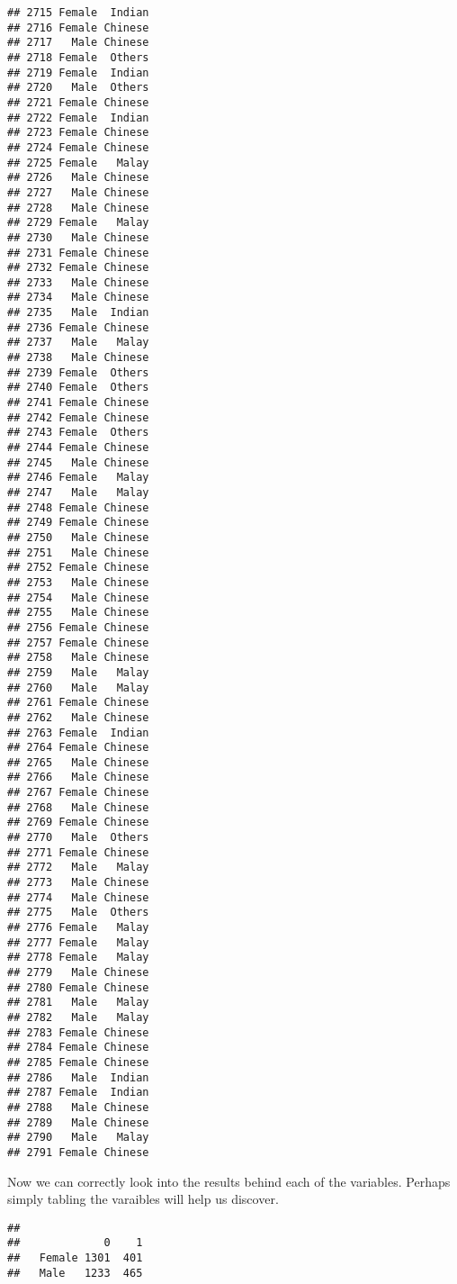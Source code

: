 \documentclass[
]{article}
\newenvironment{Shaded}{\begin{snugshade}}{\end{snugshade}}
\newcommand{\FunctionTok}[1]{\textcolor[rgb]{0.13,0.29,0.53}{\textbf{#1}}}
\newcommand{\NormalTok}[1]{#1}
\newcommand{\SpecialCharTok}[1]{\textcolor[rgb]{0.81,0.36,0.00}{\textbf{#1}}}
\begin{document}
\begin{verbatim}
## 2715 Female  Indian
## 2716 Female Chinese
## 2717   Male Chinese
## 2718 Female  Others
## 2719 Female  Indian
## 2720   Male  Others
## 2721 Female Chinese
## 2722 Female  Indian
## 2723 Female Chinese
## 2724 Female Chinese
## 2725 Female   Malay
## 2726   Male Chinese
## 2727   Male Chinese
## 2728   Male Chinese
## 2729 Female   Malay
## 2730   Male Chinese
## 2731 Female Chinese
## 2732 Female Chinese
## 2733   Male Chinese
## 2734   Male Chinese
## 2735   Male  Indian
## 2736 Female Chinese
## 2737   Male   Malay
## 2738   Male Chinese
## 2739 Female  Others
## 2740 Female  Others
## 2741 Female Chinese
## 2742 Female Chinese
## 2743 Female  Others
## 2744 Female Chinese
## 2745   Male Chinese
## 2746 Female   Malay
## 2747   Male   Malay
## 2748 Female Chinese
## 2749 Female Chinese
## 2750   Male Chinese
## 2751   Male Chinese
## 2752 Female Chinese
## 2753   Male Chinese
## 2754   Male Chinese
## 2755   Male Chinese
## 2756 Female Chinese
## 2757 Female Chinese
## 2758   Male Chinese
## 2759   Male   Malay
## 2760   Male   Malay
## 2761 Female Chinese
## 2762   Male Chinese
## 2763 Female  Indian
## 2764 Female Chinese
## 2765   Male Chinese
## 2766   Male Chinese
## 2767 Female Chinese
## 2768   Male Chinese
## 2769 Female Chinese
## 2770   Male  Others
## 2771 Female Chinese
## 2772   Male   Malay
## 2773   Male Chinese
## 2774   Male Chinese
## 2775   Male  Others
## 2776 Female   Malay
## 2777 Female   Malay
## 2778 Female   Malay
## 2779   Male Chinese
## 2780 Female Chinese
## 2781   Male   Malay
## 2782   Male   Malay
## 2783 Female Chinese
## 2784 Female Chinese
## 2785 Female Chinese
## 2786   Male  Indian
## 2787 Female  Indian
## 2788   Male Chinese
## 2789   Male Chinese
## 2790   Male   Malay
## 2791 Female Chinese
\end{verbatim}

Now we can correctly look into the results behind each of the variables.
Perhaps simply tabling the varaibles will help us discover.

\begin{Shaded}
\end{Shaded}

\begin{verbatim}
##         
##             0    1
##   Female 1301  401
##   Male   1233  465
\end{verbatim}
\end{document}
